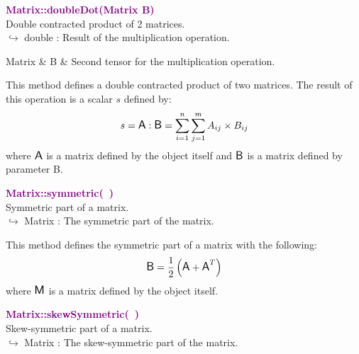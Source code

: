 \textcolor{purple}{\textbf{Matrix::doubleDot(Matrix B)}}\label{Matrix::doubleDot(Matrix B)}\\
Double contracted product of 2 matrices.\\ \hspace*{10mm}$\hookrightarrow$ double : Result of the multiplication operation.

\begin{tcolorbox}[width=\textwidth,myArgs,tabularx={ll|R}]
Matrix & B & Second tensor for the multiplication operation.
\end{tcolorbox}

This method defines a double contracted product of two matrices.
The result of this operation is a scalar $s$ defined by:
\begin{equation*}
s = \mbox{\large\ensuremath{\mathsf{A}}} : \mbox{\large\ensuremath{\mathsf{B}}} = \sum_{i=1}^{n} \sum_{j=1}^{m} A_{ij}\times B_{ij}
\end{equation*}
where $\mbox{\large\ensuremath{\mathsf{A}}}$ is a matrix defined by the object itself and $\mbox{\large\ensuremath{\mathsf{B}}}$ is a matrix defined by parameter B.

\textcolor{purple}{\textbf{Matrix::symmetric(~)}}\label{Matrix::symmetric()}\\
Symmetric part of a matrix.\\ \hspace*{10mm}$\hookrightarrow$ Matrix : The symmetric part of the matrix.

This method defines the symmetric part of a matrix with the following:
\begin{equation*}
\mbox{\large\ensuremath{\mathsf{B}}} = \frac{1}{2} \left( \mbox{\large\ensuremath{\mathsf{A}}} + \mbox{\large\ensuremath{\mathsf{A}}}^T \right)
\end{equation*}
where $\mbox{\large\ensuremath{\mathsf{M}}}$ is a matrix defined by the object itself.

\textcolor{purple}{\textbf{Matrix::skewSymmetric(~)}}\label{Matrix::skewSymmetric()}\\
Skew-symmetric part of a matrix.\\ \hspace*{10mm}$\hookrightarrow$ Matrix : The skew-symmetric part of the matrix.

